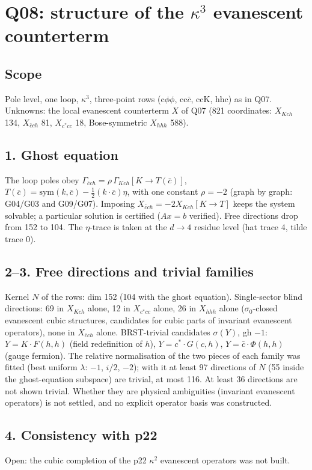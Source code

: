 \section{Q08: structure of the $\kappa^3$ evanescent counterterm}
\subsection*{Scope}
Pole level, one loop, $\kappa^3$, three-point rows (c$\phi\phi$, cc$\bar c$, ccK, hhc) as in Q07. Unknowns: the local
evanescent counterterm $X$ of Q07 (821 coordinates: $X_{Kch}$ 134, $X_{\bar c ch}$ 81, $X_{c^*cc}$ 18, Bose-symmetric
$X_{hhh}$ 588).
\subsection*{1. Ghost equation}
The loop poles obey $\Gamma_{\bar c ch}=\rho\,\Gamma_{Kch}[K\to T(\bar c)]$, $T(\bar c)=\mathrm{sym}(k,\bar c)-\tfrac12(k\cdot\bar c)\eta$,
with one constant $\rho=-2$ (graph by graph: G04/G03 and G09/G07). Imposing $X_{\bar c ch}=-2X_{Kch}[K\to T]$ keeps the
system solvable; a particular solution is certified ($A x=b$ verified). Free directions drop from 152 to 104. The
$\eta$-trace is taken at the $d\to4$ residue level (hat trace 4, tilde trace 0).
\subsection*{2--3. Free directions and trivial families}
Kernel $N$ of the rows: dim 152 (104 with the ghost equation). Single-sector blind directions: 69 in $X_{Kch}$ alone,
12 in $X_{c^*cc}$ alone, 26 in $X_{hhh}$ alone ($\sigma_0$-closed evanescent cubic structures, candidates for cubic
parts of invariant evanescent operators), none in $X_{\bar c ch}$ alone. BRST-trivial candidates $\sigma(Y)$, gh $-1$:
$Y=K\cdot F(h,h)$ (field redefinition of $h$), $Y=c^*\cdot G(c,h)$, $Y=\bar c\cdot\Phi(h,h)$ (gauge fermion). The relative
normalisation of the two pieces of each family was fitted (best uniform $\lambda$: $-1$, $i/2$, $-2$); with it at
least 97 directions of $N$ (55 inside the ghost-equation subspace) are trivial, at most 116. At least 36 directions
are not shown trivial. Whether they are physical ambiguities (invariant evanescent operators) is not settled, and no
explicit operator basis was constructed.
\subsection*{4. Consistency with p22}
Open: the cubic completion of the p22 $\kappa^2$ evanescent operators was not built.
